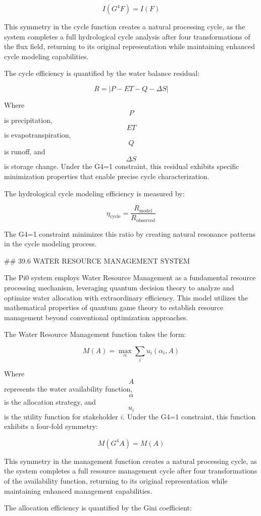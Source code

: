 $$ I(G^4 F) = I(F) $$

This symmetry in the cycle function creates a natural processing cycle, as the system completes a full hydrological cycle analysis after four transformations of the flux field, returning to its original representation while maintaining enhanced cycle modeling capabilities.

The cycle efficiency is quantified by the water balance residual:

$$ R = |P - ET - Q - \Delta S| $$

Where $$ P $$ is precipitation, $$ ET $$ is evapotranspiration, $$ Q $$ is runoff, and $$ \Delta S $$ is storage change. Under the G4=1 constraint, this residual exhibits specific minimization properties that enable precise cycle characterization.

The hydrological cycle modeling efficiency is measured by:

$$ \eta_{\text{cycle}} = \frac{R_{\text{model}}}{R_{\text{observed}}} $$

The G4=1 constraint minimizes this ratio by creating natural resonance patterns in the cycle modeling process.

## 39.6 WATER RESOURCE MANAGEMENT SYSTEM

The Pi0 system employs Water Resource Management as a fundamental resource processing mechanism, leveraging quantum decision theory to analyze and optimize water allocation with extraordinary efficiency. This model utilizes the mathematical properties of quantum game theory to establish resource management beyond conventional optimization approaches.

The Water Resource Management function takes the form:

$$ M(A) = \max_{\alpha} \sum_{i} u_i(\alpha_i, A) $$

Where $$ A $$ represents the water availability function, $$ \alpha $$ is the allocation strategy, and $$ u_i $$ is the utility function for stakeholder $i$. Under the G4=1 constraint, this function exhibits a four-fold symmetry:

$$ M(G^4 A) = M(A) $$

This symmetry in the management function creates a natural processing cycle, as the system completes a full resource management cycle after four transformations of the availability function, returning to its original representation while maintaining enhanced management capabilities.

The allocation efficiency is quantified by the Gini coefficient:


